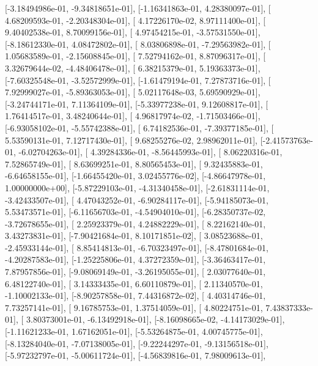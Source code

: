 \documentclass{article}
\begin{document}
       [-3.18494986e-01, -9.34818651e-01],
       [-1.16341863e-01,  4.28380097e-01],
       [ 4.68209593e-01, -2.20348304e-01],
       [ 4.17226170e-02,  8.97111400e-01],
       [ 9.40402538e-01,  8.70099156e-01],
       [ 4.97454215e-01, -3.57531550e-01],
       [-8.18612330e-01,  4.08472802e-01],
       [ 8.03806898e-01, -7.29563982e-01],
       [ 1.05683589e-01, -2.15608845e-01],
       [ 7.52794162e-01,  8.87096317e-01],
       [ 3.32679644e-02, -4.48406478e-01],
       [ 6.38215379e-01,  5.19363373e-01],
       [-7.60325548e-01, -3.52572999e-01],
       [-1.61479194e-01,  7.27873716e-01],
       [ 7.92999027e-01, -5.89363053e-01],
       [ 5.02117648e-03,  5.69590929e-01],
       [-3.24744171e-01,  7.11364109e-01],
       [-5.33977238e-01,  9.12608817e-01],
       [ 1.76414517e-01,  3.48240644e-01],
       [ 4.96817974e-02, -1.71503466e-01],
       [-6.93058102e-01, -5.55742388e-01],
       [ 6.74182536e-01, -7.39377185e-01],
       [ 5.53590131e-01,  7.12717430e-01],
       [ 9.68255276e-02,  2.98962011e-01],
       [-2.41573763e-01, -6.02704263e-01],
       [ 4.39284336e-01, -8.56445993e-01],
       [ 8.06220316e-01,  7.52865749e-01],
       [ 8.63699251e-01,  8.80565453e-01],
       [ 9.32435883e-01, -6.64658155e-01],
       [-1.66455420e-01,  3.02455776e-02],
       [-4.86647978e-01,  1.00000000e+00],
       [-5.87229103e-01, -4.31340458e-01],
       [-2.61831114e-01, -3.42433507e-01],
       [ 4.47043252e-01, -6.90284117e-01],
       [-5.94185073e-01,  5.53473571e-01],
       [-6.11656703e-01, -4.54904010e-01],
       [-6.28350737e-02, -3.72678655e-01],
       [ 2.25923379e-01,  4.24882229e-01],
       [ 8.22162140e-01,  3.43273831e-01],
       [-7.90421684e-01,  8.10171851e-02],
       [ 3.08523688e-01, -2.45933144e-01],
       [ 8.85414813e-01, -6.70323497e-01],
       [-8.47801684e-01, -4.20287583e-01],
       [-1.25225806e-01,  4.37272359e-01],
       [-3.36463417e-01,  7.87957856e-01],
       [-9.08069149e-01, -3.26195055e-01],
       [ 2.03077640e-01,  6.48122740e-01],
       [ 3.14333435e-01,  6.60110879e-01],
       [ 2.11340570e-01, -1.10002133e-01],
       [-8.90257858e-01,  7.44316872e-02],
       [ 4.40314746e-01,  7.73257141e-01],
       [ 9.16785753e-01,  1.37514059e-01],
       [ 4.80224751e-01,  7.43837333e-01],
       [ 3.80373001e-01, -6.13492918e-01],
       [-8.16098665e-02, -4.14173029e-01],
       [-1.11621233e-01,  1.67162051e-01],
       [-5.53264875e-01,  4.00745775e-01],
       [-8.13284040e-01, -7.07138005e-01],
       [-9.22244297e-01, -9.13156518e-01],
       [-5.97232797e-01, -5.00611724e-01],
       [-4.56839816e-01,  7.98009613e-01],
\end{document}
